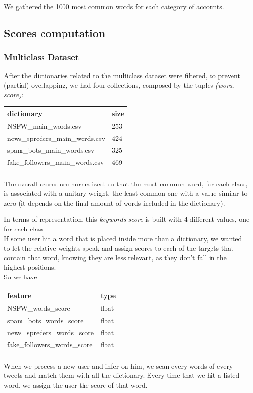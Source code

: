 We gathered the 1000 most common words for each category of accounts.

\subsection{Scores computation}

\subsubsection{Multiclass Dataset}
After the dictionaries related to the multiclass dataset were filtered, to prevent (partial) overlapping, we had four collections, composed by the tuples \textit{(word, score)}:
\small
\begin{center}
	\begin{tabular}{ll}
		\\dictionary&size\\
		\hline\hline
		NSFW\_main\_words.csv&253\\
		news\_spreders\_main\_words.csv&424\\
		spam\_bots\_main\_words.csv&325\\
		fake\_followers\_main\_words.csv&469\\\hline\\
	\end{tabular}
\end{center}
\normalsize

The overall scores are normalized, so that the most common word, for each class, is associated with a unitary weight, the least common one with a value similar to zero (it depends on the final amount of words included in the dictionary).

In terms of representation, this \textit{keywords score} is built with 4 different values, one for each class.\\

If some user hit a word that is placed inside more than a dictionary, we wanted to let the relative weights speak and assign scores to each of the targets that contain that word, knowing they are less relevant, as they don't fall in the highest positions.\\
So we have

\small
\begin{center}
	\begin{tabular}{ll}
		\\feature&type\\
		\hline\hline
		NSFW\_words\_score&float\\
		spam\_bots\_words\_score&float\\
		news\_spreders\_words\_score&float\\
		fake\_followers\_words\_score&float\\\hline\\
	\end{tabular}
\end{center}
\normalsize
When we process a new user and infer on him, we scan every words of every tweets and match them with all the dictionary. Every time that we hit a listed word, we assign the user the score of that word.

